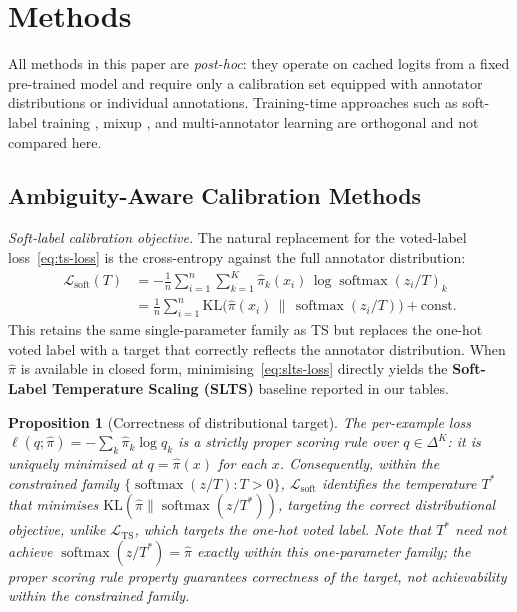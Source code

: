 \documentclass[10pt,journal,compsoc]{IEEEtran}
\newcommand{\pihat}{\hat{\pi}}
\newcommand{\KL}{\mathrm{KL}}
\newtheorem{proposition}{Proposition}
\begin{document}
\section{Methods}
\label{sec:methods}

All methods in this paper are \emph{post-hoc}: they operate on cached logits from a fixed pre-trained model and require only a calibration set equipped with annotator distributions or individual annotations.  Training-time approaches such as soft-label training \cite{szegedy2016rethinking,muller2019does}, mixup \cite{thulasidasan2019mixup}, and multi-annotator learning \cite{uma2021learning,rodrigues2018deep} are orthogonal and not compared here.

\subsection{Ambiguity-Aware Calibration Methods}

\noindent\textit{Soft-label calibration objective.}
The natural replacement for the voted-label loss~\eqref{eq:ts-loss} is the cross-entropy against the full annotator distribution:
\begin{align}
  \mathcal{L}_{\text{soft}}(T)
  &= -\frac{1}{n}\sum_{i=1}^n \sum_{k=1}^K
    \pihat_k(x_i)\,\log \operatorname{softmax}(z_i/T)_k \nonumber\\
  &= \frac{1}{n}\sum_{i=1}^n \KL\!\bigl(\pihat(x_i)\,\|\,\operatorname{softmax}(z_i/T)\bigr) + \text{const}.
  \label{eq:slts-loss}
\end{align}
This retains the same single-parameter family as TS but replaces the one-hot voted label with a target that correctly reflects the annotator distribution.  When $\pihat$ is available in closed form, minimising~\eqref{eq:slts-loss} directly yields the \textbf{Soft-Label Temperature Scaling (SLTS)} baseline reported in our tables.

\begin{proposition}[Correctness of distributional target]
\label{prop:proper}
The per-example loss $\ell(q;\pihat) = -\sum_k \pihat_k \log q_k$ is a strictly proper scoring rule over $q\in\Delta^K$: it is uniquely minimised at $q=\pihat(x)$ for each $x$.  Consequently, within the constrained family $\{\operatorname{softmax}(z/T): T>0\}$, $\mathcal{L}_{\text{soft}}$ identifies the temperature $T^*$ that minimises $\mathrm{KL}(\pihat\|\operatorname{softmax}(z/T^*))$, targeting the correct distributional objective, unlike $\mathcal{L}_{\text{TS}}$, which targets the one-hot voted label.  Note that $T^*$ need not achieve $\operatorname{softmax}(z/T^*)=\pihat$ exactly within this one-parameter family; the proper scoring rule property guarantees correctness of the \emph{target}, not achievability within the constrained family.
\end{proposition}
\end{document}
